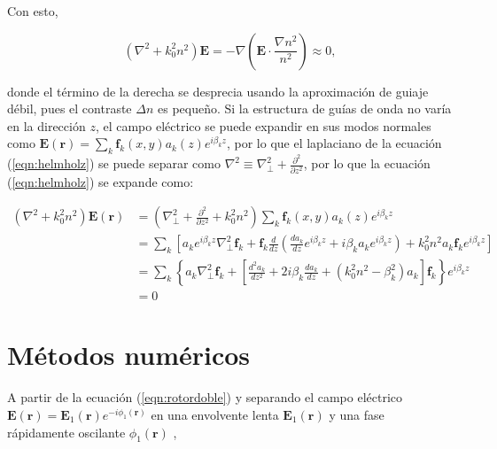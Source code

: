 Con esto, 

\begin{equation}
	(\nabla^2  + k_0^2n^2)\textbf{E} = -\nabla\left(\textbf{E} \cdot \frac{\nabla n^2}{n^2}\right) \approx 0, \label{eqn:helmholz}
\end{equation}

donde el término de la derecha se desprecia usando la aproximación de guiaje débil, pues el contraste $\Delta n$ es pequeño. Si la estructura de guías de onda no varía en la dirección $z$, el campo eléctrico se puede expandir en sus modos normales como $\textbf{E}(\textbf{r}) = \sum_k \textbf{f}_k(x, y) a_k(z) e^{i\beta_k z}$, por lo que el laplaciano de la ecuación (\ref{eqn:helmholz}) se puede separar como $\nabla^2 \equiv \nabla_\perp^2 + \frac{\partial^2}{\partial z^2}$, por lo que la ecuación (\ref{eqn:helmholz}) se expande como:

\begin{align}
	(\nabla^2  + k_0^2n^2) \textbf{E}(\textbf{r}) &= \left(\nabla_\perp^2 + \frac{\partial^2}{\partial z^2} + k_0^2n^2\right)\sum_k \textbf{f}_k(x, y) a_k(z) e^{i\beta_k z} 
\\	
	&= \sum_k \left[ a_ke^{i\beta_k z} \nabla_\perp^2 \textbf{f}_k + \textbf{f}_k\frac{d}{dz}\left( \frac{da_k}{dz}e^{i\beta_k z}  + i\beta_k a_ke^{i\beta_k z}\right) + k_0^2n^2 a_k\textbf{f}_k  e^{i\beta_k z}\right]
	\\
	&=
	\sum_k \left\{ a_k \nabla_\perp^2 \textbf{f}_k + \left[\frac{d^2 a_k}{dz^2} + 2i\beta_k \frac{d a_k}{dz} + \left(k_0^2n^2  - \beta_k^2\right) a_k \right]\textbf{f}_k \right\}e^{i\beta_k z}
	\\
	&=
	0
\end{align}

\section{Métodos numéricos}

A partir de la ecuación (\ref{eqn:rotordoble}) y separando el campo eléctrico $\textbf{E}(\textbf{r}) = \textbf{E}_1(\textbf{r}) e^{-i \phi_1 (\textbf{r})}$ en una envolvente lenta $\textbf{E}_1(\textbf{r})$ y una fase rápidamente oscilante $\phi_1 (\textbf{r})$ ,

